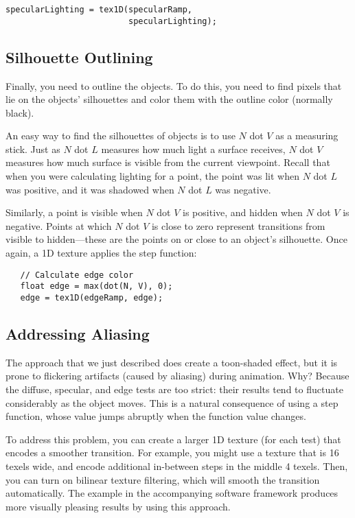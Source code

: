 \documentclass[../main.tex]{subfiles}
\begin{document}
\FloatBarrier
\begin{lstlisting}
specularLighting = tex1D(specularRamp,
                         specularLighting);
\end{lstlisting}
\FloatBarrier

\subsection*{Silhouette Outlining}

Finally, you need to outline the objects. To do this, you need to find pixels that lie on the objects' silhouettes and color them with the outline color (normally black).

An easy way to find the silhouettes of objects is to use $N$ dot $V$ as a measuring stick. Just as $N$ dot $L$ measures how much light a surface receives, $N$ dot $V$ measures how much surface is visible from the current viewpoint. Recall that when you were calculating lighting for a point, the point was lit when $N$ dot $L$ was positive, and it was shadowed when $N$ dot $L$ was negative.

Similarly, a point is visible when $N$ dot $V$ is positive, and hidden when $N$ dot $V$ is negative. Points at which $N$ dot $V$ is close to zero represent transitions from visible to hidden—these are the points on or close to an object's silhouette. Once again, a 1D texture applies the step function:

\FloatBarrier
\begin{lstlisting}
   // Calculate edge color
   float edge = max(dot(N, V), 0);
   edge = tex1D(edgeRamp, edge);
\end{lstlisting}
\FloatBarrier
   
\subsection*{Addressing Aliasing}

The approach that we just described does create a toon-shaded effect, but it is prone to flickering artifacts (caused by aliasing) during animation. Why? Because the diffuse, specular, and edge tests are too strict: their results tend to fluctuate considerably as the object moves. This is a natural consequence of using a step function, whose value jumps abruptly when the function value changes.

To address this problem, you can create a larger 1D texture (for each test) that encodes a smoother transition. For example, you might use a texture that is 16 texels wide, and encode additional in-between steps in the middle 4 texels. Then, you can turn on bilinear texture filtering, which will smooth the transition automatically. The example in the accompanying software framework produces more visually pleasing results by using this approach.
\end{document}
